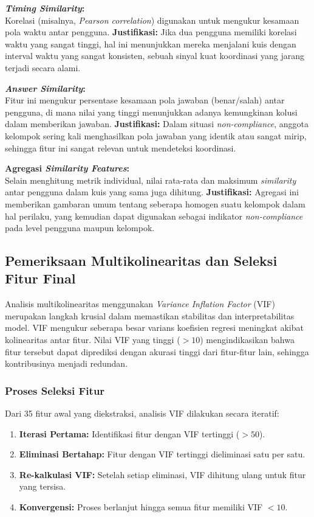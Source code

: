\textbf{\textit{Timing Similarity}:} \\
Korelasi (misalnya, \textit{Pearson correlation}) digunakan untuk mengukur kesamaan pola waktu antar pengguna.
\textbf{Justifikasi:} Jika dua pengguna memiliki korelasi waktu yang sangat tinggi, hal ini menunjukkan mereka menjalani kuis dengan interval waktu yang sangat konsisten, sebuah sinyal kuat koordinasi yang jarang terjadi secara alami.

\textbf{\textit{Answer Similarity}:} \\
Fitur ini mengukur persentase kesamaan pola jawaban (benar/salah) antar pengguna, di mana nilai yang tinggi menunjukkan adanya kemungkinan kolusi dalam memberikan jawaban.
\textbf{Justifikasi:} Dalam situasi \textit{non-compliance}, anggota kelompok sering kali menghasilkan pola jawaban yang identik atau sangat mirip, sehingga fitur ini sangat relevan untuk mendeteksi koordinasi.

\textbf{Agregasi \textit{Similarity Features}:} \\
Selain menghitung metrik individual, nilai rata-rata dan maksimum \textit{similarity} antar pengguna dalam kuis yang sama juga dihitung.
\textbf{Justifikasi:} Agregasi ini memberikan gambaran umum tentang seberapa homogen suatu kelompok dalam hal perilaku, yang kemudian dapat digunakan sebagai indikator \textit{non-compliance} pada level pengguna maupun kelompok.

\subsection{Pemeriksaan Multikolinearitas dan Seleksi Fitur Final}
\label{sec:pemeriksaanMultikolinearitas}

Analisis multikolinearitas menggunakan \textit{Variance Inflation Factor} (VIF) merupakan langkah krusial dalam memastikan stabilitas dan interpretabilitas model. VIF mengukur seberapa besar varians koefisien regresi meningkat akibat kolinearitas antar fitur. Nilai VIF yang tinggi ($>10$) mengindikasikan bahwa fitur tersebut dapat diprediksi dengan akurasi tinggi dari fitur-fitur lain, sehingga kontribusinya menjadi redundan.

\subsubsection{Proses Seleksi Fitur}
Dari 35 fitur awal yang diekstraksi, analisis VIF dilakukan secara iteratif:
\begin{enumerate}
    \item \textbf{Iterasi Pertama:} Identifikasi fitur dengan VIF tertinggi ($>50$).
    \item \textbf{Eliminasi Bertahap:} Fitur dengan VIF tertinggi dieliminasi satu per satu.
    \item \textbf{Re-kalkulasi VIF:} Setelah setiap eliminasi, VIF dihitung ulang untuk fitur yang tersisa.
    \item \textbf{Konvergensi:} Proses berlanjut hingga semua fitur memiliki VIF $< 10$.
\end{enumerate}

